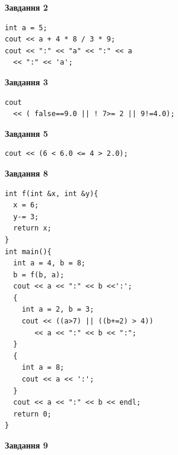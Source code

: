 \documentclass[12pt, ukrainian]{article}
\begin{document}
{\begin {large}
\begin{minipage}[t]{7.0cm}
\end{minipage}
\vline \hspace{1mm}
\begin{minipage}[t]{11.0cm}

\begin{center}
\textbf{Завдання 2}
\end{center}
\vspace{-8mm}

\begin{verbatim}
int a = 5;
cout << a + 4 * 8 / 3 * 9;
cout << ":" << "a" << ":" << a 
  << ":" << 'a';
\end{verbatim}



\begin{center}
\textbf{Завдання 3}
\end{center}
\vspace{-8mm}

\begin{verbatim}
cout 
  << ( false==9.0 || ! 7>= 2 || 9!=4.0);
\end{verbatim}



\begin{center}
\textbf{Завдання 5}
\end{center}
\vspace{-8mm}

\begin{verbatim}
cout << (6 < 6.0 <= 4 > 2.0);
\end{verbatim}



\begin{center}
\textbf{Завдання 8}
\end{center}
\vspace{-8mm}

\begin{verbatim}
int f(int &x, int &y){
  x = 6;
  y-= 3;
  return x;
}
int main(){
  int a = 4, b = 8;
  b = f(b, a);
  cout << a << ":" << b <<':';
  {
    int a = 2, b = 3;
    cout << ((a>7) || ((b+=2) > 4))
       << a << ":" << b << ":";
  }
  {
    int a = 8;
    cout << a << ':';
  }
  cout << a << ":" << b << endl;
  return 0;
}
\end{verbatim}

\end{minipage}


\begin{minipage}[t]{7.0cm}

\begin{center}
\textbf{Завдання 9}
\end{center}
\vspace{-8mm}


\end{minipage}
\end{large}}
\end{document}
